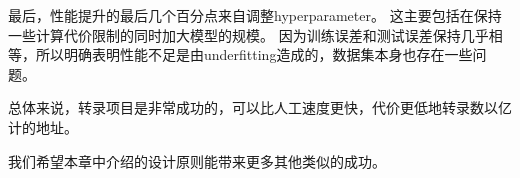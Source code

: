 
最后，性能提升的最后几个百分点来自调整\gls{hyperparameter}。
这主要包括在保持一些计算代价限制的同时加大模型的规模。
因为训练误差和测试误差保持几乎相等，所以明确表明性能不足是由\gls{underfitting}造成的，数据集本身也存在一些问题。


总体来说，转录项目是非常成功的，可以比人工速度更快，代价更低地转录数以亿计的地址。

我们希望本章中介绍的设计原则能带来更多其他类似的成功。

